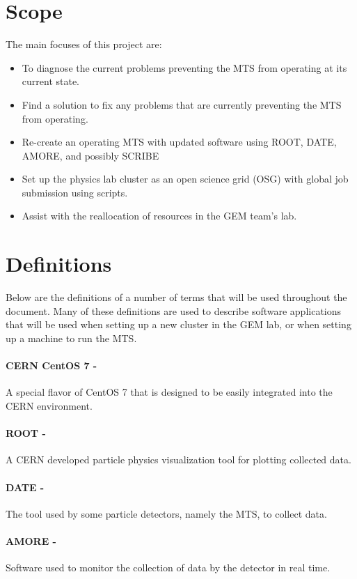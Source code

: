 \documentclass[12pt]{article}
\newcommand\tab[1][1cm]{\hspace*{#1}}
\begin{document}
\section*{Scope}
%
The main focuses of this project are:
\begin{itemize}
	\item To diagnose the current problems preventing the MTS from operating at its current state.
	\item Find a solution to fix any problems that are currently preventing the MTS from operating.
	\item Re-create an operating MTS with updated software using ROOT, DATE, AMORE, and possibly SCRIBE
	\item Set up the physics lab cluster as an open science grid (OSG) with global job submission using scripts.
	\item Assist with the reallocation of resources in the GEM team’s lab. 
\end{itemize}

\section*{Definitions}
%
\tab Below are the definitions of a number of terms that will be used throughout the document. Many of these definitions are used to describe software applications that will be used when setting up a new cluster in the GEM lab, or when setting up a machine to run the MTS.
\paragraph{CERN CentOS 7 -}A special flavor of CentOS 7 that is designed to be easily integrated into the CERN environment.
\paragraph{ROOT -}A CERN developed particle physics visualization tool for plotting collected data.
\paragraph{DATE -}The tool used by some particle detectors, namely the MTS, to collect data.
\paragraph{AMORE -} Software used to monitor the collection of data by the detector in real time.
\end{document}

